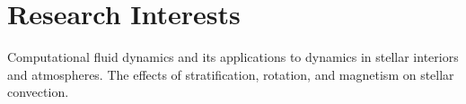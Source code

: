 \section{Research Interests}

Computational fluid dynamics and its applications to dynamics in stellar interiors and atmospheres.
The effects of stratification, rotation, and magnetism on stellar convection.

